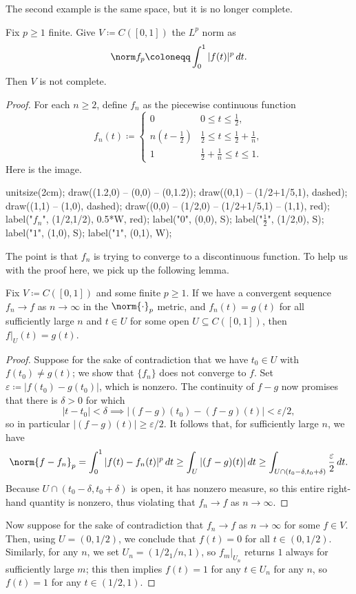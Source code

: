 \documentclass[../notes.tex]{subfiles}
\begin{document}
The second example is the same space, but it is no longer complete.
\begin{example}
	Fix $p\ge1$ finite. Give $V\coloneqq C([0,1])$ the $L^p$ norm as
	\[\norm f_p\coloneqq\int_0^1|f(t)|^p\,dt.\]
	Then $V$ is not complete.
\end{example}
\begin{proof}
	For each $n\ge2$, define $f_n$ as the piecewise continuous function
	\[f_n(t)\coloneqq\begin{cases}
		0 & 0\le t\le \frac12, \\
		n(t-\frac12) & \frac12\le t\le\frac12+\frac1n, \\
		1 & \frac12+\frac1n\le t\le1.
	\end{cases}\]
	Here is the image.
	\begin{center}
		\begin{asy}
			unitsize(2cm);
			draw((1.2,0) -- (0,0) -- (0,1.2));
			draw((0,1) -- (1/2+1/5,1), dashed);
			draw((1,1) -- (1,0), dashed);
			draw((0,0) -- (1/2,0) -- (1/2+1/5,1) -- (1,1), red);
			label("$f_n$", (1/2,1/2), 0.5*W, red);
			label("$0$", (0,0), S);
			label("$\frac12$", (1/2,0), S);
			label("$1$", (1,0), S);
			label("$1$", (0,1), W);
		\end{asy}
	\end{center}
	The point is that $f_n$ is trying to converge to a discontinuous function. To help us with the proof here, we pick up the following lemma.
	\begin{lemma}
		Fix $V\coloneqq C([0,1])$ and some finite $p\ge1$. If we have a convergent sequence $f_n\to f$ as $n\to\infty$ in the $\norm{\cdot}_p$ metric, and $f_n(t)=g(t)$ for all sufficiently large $n$ and $t\in U$ for some open $U\subseteq C([0,1])$, then $f|_U(t)=g(t)$.
	\end{lemma}
	\begin{proof}
		Suppose for the sake of contradiction that we have $t_0\in U$ with $f(t_0)\ne g(t)$; we show that $\{f_n\}$ does not converge to $f$. Set $\varepsilon\coloneqq|f(t_0)-g(t_0)|$, which is nonzero. The continuity of $f-g$ now promises that there is $\delta>0$ for which
		\[|t-t_0|<\delta\implies|(f-g)(t_0)-(f-g)(t)|<\varepsilon/2,\]
		so in particular $|(f-g)(t)|\ge\varepsilon/2$. It follows that, for sufficiently large $n$, we have
		\[\norm{f-f_n}_p=\int_0^1|f(t)-f_n(t)|^p\,dt\ge\int_U|(f-g)(t)|\,dt\ge\int_{U\cap(t_0-\delta,t_0+\delta)}\frac\varepsilon2\,dt.\]
		Because $U\cap(t_0-\delta,t_0+\delta)$ is open, it has nonzero measure, so this entire right-hand quantity is nonzero, thus violating that $f_n\to f$ as $n\to\infty$.
	\end{proof}
	Now suppose for the sake of contradiction that $f_n\to f$ as $n\to\infty$ for some $f\in V$. Then, using $U=(0,1/2)$, we conclude that $f(t)=0$ for all $t\in(0,1/2)$. Similarly, for any $n$, we set $U_n=(1/2_1/n,1)$, so $f_m|_{U_n}$ returns $1$ always for sufficiently large $m$; this then implies $f(t)=1$ for any $t\in U_n$ for any $n$, so $f(t)=1$ for any $t\in(1/2,1)$.


\end{proof}
\end{document}
